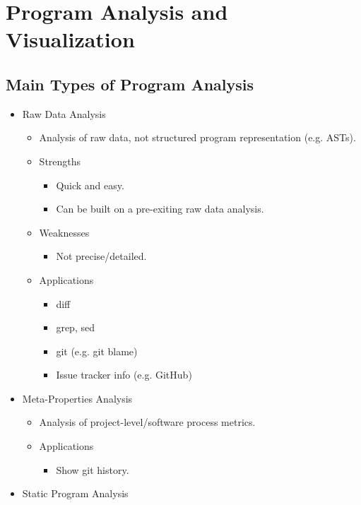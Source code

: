 \documentclass{article}
\begin{document}
\section{Program Analysis and Visualization}

\subsection{Main Types of Program Analysis}

\begin{itemize}
    \item Raw Data Analysis
    \begin{itemize}
        \item Analysis of raw data, not structured program representation (e.g. ASTs).
        \item Strengths
        \begin{itemize}
            \item Quick and easy.
            \item Can be built on a pre-exiting raw data analysis.
        \end{itemize}
        \item Weaknesses
        \begin{itemize}
            \item Not precise/detailed.
        \end{itemize}
        \item Applications
        \begin{itemize}
            \item diff
            \item grep, sed
            \item git (e.g. git blame)
            \item Issue tracker info (e.g. GitHub)
        \end{itemize}
    \end{itemize}
    \item Meta-Properties Analysis
    \begin{itemize}
        \item Analysis of project-level/software process metrics.
        \item Applications
        \begin{itemize}
            \item Show git history.
        \end{itemize}
    \end{itemize}
    \item Static Program Analysis

\end{itemize}
\end{document}
